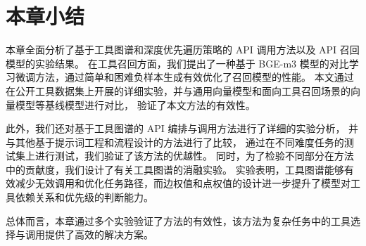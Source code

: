 
\section{本章小结}

本章全面分析了基于工具图谱和深度优先遍历策略的 API 调用方法以及 API 召回模型的实验结果。
在工具召回方面，我们提出了一种基于 BGE-m3 模型的对比学习微调方法，通过简单和困难负样本生成有效优化了召回模型的性能。
本文通过在公开工具数据集上开展的详细实验，并与通用向量模型和面向工具召回场景的向量模型等基线模型进行对比，
验证了本文方法的有效性。

此外，我们还对基于工具图谱的 API 编排与调用方法进行了详细的实验分析，
并与其他基于提示词工程和流程设计的方法进行了比较，
通过在不同难度任务的测试集上进行测试，我们验证了该方法的优越性。
同时，为了检验不同部分在方法中的贡献度，我们设计了有关工具图谱的消融实验。
实验表明，工具图谱能够有效减少无效调用和优化任务路径，而边权值和点权值的设计进一步提升了模型对工具依赖关系和优先级的判断能力。

总体而言，本章通过多个实验验证了方法的有效性，该方法为复杂任务中的工具选择与调用提供了高效的解决方案。